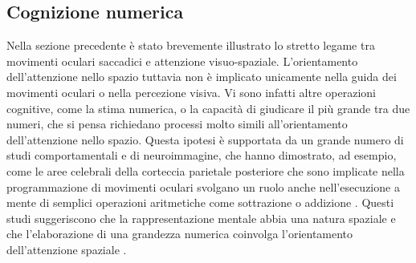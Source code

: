 \documentclass[12pt]{article}
\begin{document}
\subsection{Cognizione numerica}
Nella sezione precedente è stato brevemente illustrato lo stretto legame tra movimenti oculari saccadici e attenzione visuo-spaziale. L'orientamento dell'attenzione nello spazio tuttavia non è implicato unicamente nella guida dei movimenti oculari o nella percezione visiva. Vi sono infatti altre operazioni cognitive, come la stima numerica, o la capacità di giudicare il più grande tra due numeri, che si pensa richiedano processi molto simili all'orientamento dell'attenzione nello spazio. Questa ipotesi è supportata da un grande numero di studi comportamentali e di neuroimmagine, che hanno dimostrato, ad esempio, come le aree celebrali della corteccia parietale posteriore che sono implicate nella programmazione di movimenti oculari svolgano un ruolo anche nell'esecuzione a mente di semplici operazioni aritmetiche come sottrazione o addizione \cite{Knops2009}. Questi studi suggeriscono che la rappresentazione mentale abbia una natura spaziale e che l'elaborazione di una grandezza numerica coinvolga l'orientamento dell'attenzione spaziale \cite{Hubbard2005}. 
\end{document}
